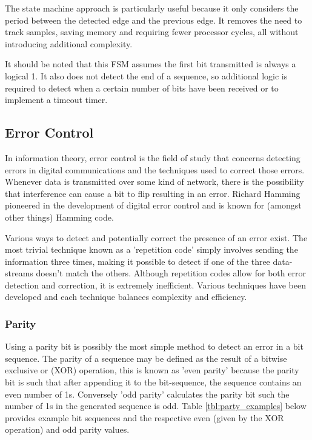 The state machine approach is particularly useful because it only considers the period between the detected edge and the previous edge. It removes the need to track samples, saving memory and requiring fewer processor cycles, all without introducing additional complexity.

It should be noted that this FSM assumes the first bit transmitted is always a logical 1. It also does not detect the end of a sequence, so additional logic is required to detect when a certain number of bits have been received or to implement a timeout timer.

\subsection{Error Control}

In information theory, error control is the field of study that concerns detecting errors in digital communications and the techniques used to correct those errors. Whenever data is transmitted over some kind of network, there is the possibility that interference can cause a bit to flip resulting in an error. Richard Hamming pioneered in the development of digital error control and is known for (amongst other things) Hamming code.

Various ways to detect and potentially correct the presence of an error exist. The most trivial technique known as a 'repetition code' simply involves sending the information three times, making it possible to detect if one of the three data-streams doesn't match the others. Although repetition codes allow for both error detection and correction, it is extremely inefficient. Various techniques have been developed and each technique balances complexity and efficiency.

\subsubsection{Parity}
Using a parity bit is possibly the most simple method to detect an error in a bit sequence. The parity of a sequence may be defined as the result of a bitwise exclusive or (XOR) operation, this is known as 'even parity' because the parity bit is such that after appending it to the bit-sequence, the sequence contains an even number of 1s. Conversely 'odd parity' calculates the parity bit such the number of 1s in the generated sequence is odd. Table \ref{tbl:party_examples} below provides example bit sequences and the respective even (given by the XOR operation) and odd parity values.

